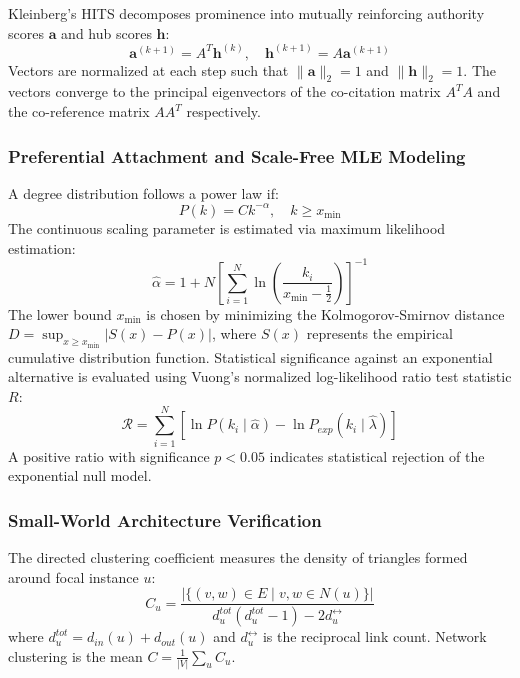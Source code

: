 \documentclass[conference]{IEEEtran}
\begin{document}
Kleinberg's HITS decomposes prominence into mutually reinforcing authority scores $\mathbf{a}$ and hub scores $\mathbf{h}$:
\begin{equation}
    \mathbf{a}^{(k+1)} = A^T \mathbf{h}^{(k)}, \quad \mathbf{h}^{(k+1)} = A \mathbf{a}^{(k+1)}
    \label{eq:hits}
\end{equation}
Vectors are normalized at each step such that $\|\mathbf{a}\|_2 = 1$ and $\|\mathbf{h}\|_2 = 1$. The vectors converge to the principal eigenvectors of the co-citation matrix $A^T A$ and the co-reference matrix $A A^T$ respectively.

\subsubsection{Preferential Attachment and Scale-Free MLE Modeling}
A degree distribution follows a power law if:
\begin{equation}
    P(k) = C k^{-\alpha}, \quad k \ge x_{\min}
    \label{eq:powerlaw}
\end{equation}
The continuous scaling parameter is estimated via maximum likelihood estimation:
\begin{equation}
    \hat{\alpha} = 1 + N \left[ \sum_{i=1}^N \ln \left( \frac{k_i}{x_{\min} - \frac{1}{2}} \right) \right]^{-1}
    \label{eq:mle_alpha}
\end{equation}
The lower bound $x_{\min}$ is chosen by minimizing the Kolmogorov-Smirnov distance $D = \sup_{x \ge x_{\min}} |S(x) - P(x)|$, where $S(x)$ represents the empirical cumulative distribution function. Statistical significance against an exponential alternative is evaluated using Vuong's normalized log-likelihood ratio test statistic $R$:
\begin{equation}
    \mathcal{R} = \sum_{i=1}^N \left[ \ln P(k_i \mid \hat{\alpha}) - \ln P_{exp}(k_i \mid \hat{\lambda}) \right]
    \label{eq:vuong}
\end{equation}
A positive ratio with significance $p < 0.05$ indicates statistical rejection of the exponential null model.

\subsubsection{Small-World Architecture Verification}
The directed clustering coefficient measures the density of triangles formed around focal instance $u$:
\begin{equation}
    C_u = \frac{|\{(v, w) \in E \mid v, w \in N(u)\}|}{d_u^{tot}(d_u^{tot} - 1) - 2 d_u^{\leftrightarrow}}
    \label{eq:clustering}
\end{equation}
where $d_u^{tot} = d_{in}(u) + d_{out}(u)$ and $d_u^{\leftrightarrow}$ is the reciprocal link count. Network clustering is the mean $C = \frac{1}{|V|} \sum_u C_u$.
\end{document}
